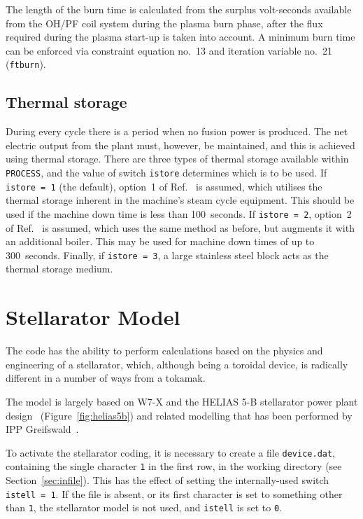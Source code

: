 \documentclass[11pt,a4paper]{report}
\newcommand{\process}{\mbox{\texttt{PROCESS}}}
\begin{document}
The length of the burn time is calculated from the surplus volt-seconds
available from the OH/PF coil system during the plasma burn phase, after the
flux required during the plasma start-up is taken into account. A minimum burn
time can be enforced via constraint equation no.\ 13 and iteration variable
no.\ 21 (\texttt{ftburn}).

\subsection{Thermal storage}

During every cycle there is a period when no fusion power is produced. The net
electric output from the plant must, however, be maintained, and this is
achieved using thermal storage. There are three types of thermal storage
available within \process, and the value of switch \texttt{istore} determines
which is to be used. If \texttt{istore = 1} (the default), option~1 of
Ref.~\cite{ELECTROWATT} is assumed, which utilises the thermal storage
inherent in the machine's steam cycle equipment. This should be used if the
machine down time is less than 100~seconds. If \texttt{istore = 2}, option~2
of Ref.~\cite{ELECTROWATT} is assumed, which uses the same method as before,
but augments it with an additional boiler. This may be used for machine down
times of up to 300~seconds. Finally, if \texttt{istore = 3}, a large stainless
steel block acts as the thermal storage medium.


\section{Stellarator Model}

The code has the ability to perform calculations based on the physics and
engineering of a stellarator, which, although being a toroidal device, is
radically different in a number of ways from a tokamak.

The model is largely based on W7-X and the HELIAS 5-B stellarator power plant
design~\cite{helias5b} (Figure~\ref{fig:helias5b}) and related modelling that
has been performed by IPP Greifswald~\cite{stell_geometry, stell_divertor,
  stell_coil}.

To activate the stellarator coding, it is necessary to create a file
\texttt{device.dat}, containing the single character \texttt{1} in the first
row, in the working directory (see Section~\ref{sec:infile}). This has the
effect of setting the internally-used switch \texttt{istell = 1}. If the file
is absent, or its first character is set to something other than \texttt{1},
the stellarator model is not used, and \texttt{istell} is set to
\texttt{0}.
\end{document}
